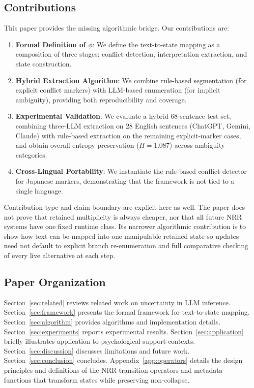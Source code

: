 \documentclass[11pt,a4paper]{article}
\begin{document}
\subsection{Contributions}

This paper provides the missing algorithmic bridge. Our contributions are:

\begin{enumerate}
    \item \textbf{Formal Definition of $\phi$}: We define the text-to-state mapping as a 
          composition of three stages: conflict detection, interpretation extraction, 
          and state construction.
    
    \item \textbf{Hybrid Extraction Algorithm}: We combine rule-based segmentation 
          (for explicit conflict markers) with LLM-based enumeration (for implicit 
          ambiguity), providing both reproducibility and coverage.
    
    \item \textbf{Experimental Validation}: We evaluate a hybrid 68-sentence test set,
          combining three-LLM extraction on 28 English sentences (ChatGPT, Gemini,
          Claude) with rule-based extraction on the remaining explicit-marker cases,
          and obtain overall entropy preservation ($H = 1.087$) across ambiguity
          categories.
    
	    \item \textbf{Cross-Lingual Portability}: We instantiate the rule-based conflict 
	          detector for Japanese markers, demonstrating that the framework is not 
	          tied to a single language.
\end{enumerate}

Contribution type and claim boundary are explicit here as well. The paper does not prove that retained multiplicity is always cheaper, nor that all future NRR systems have one fixed runtime class. Its narrower algorithmic contribution is to show how text can be mapped into one manipulable retained state so updates need not default to explicit branch re-enumeration and full comparative checking of every live alternative at each step.

\subsection{Paper Organization}

Section~\ref{sec:related} reviews related work on uncertainty in LLM inference. 
Section~\ref{sec:framework} presents the formal framework for text-to-state mapping. 
Section~\ref{sec:algorithm} provides algorithms and implementation details. 
Section~\ref{sec:experiments} reports experimental results. 
Section~\ref{sec:application} briefly illustrates application to psychological support contexts. 
Section~\ref{sec:discussion} discusses limitations and future work. 
Section~\ref{sec:conclusion} concludes. 
Appendix~\ref{app:operators} details the design principles and definitions of 
the NRR transition operators and metadata functions that transform states while preserving non-collapse.
\end{document}
